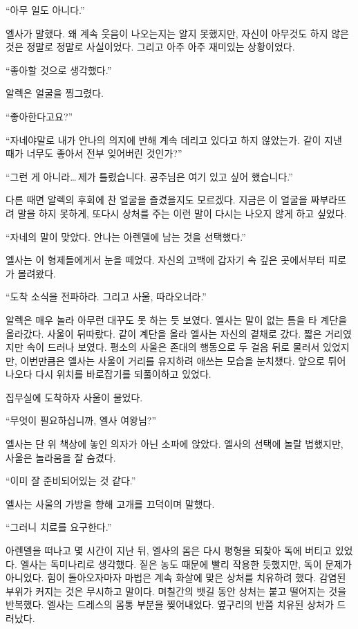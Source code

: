 ``아무 일도 아니다.''

엘사가 말했다. 왜 계속 웃음이 나오는지는 알지 못했지만, 자신이 아무것도 하지 않은 것은 정말로 정말로 사실이었다. 그리고 아주 아주 재미있는 상황이었다.

``좋아할 것으로 생각했다.''

알렉은 얼굴을 찡그렸다.

``좋아한다고요?''

``자네야말로 내가 안나의 의지에 반해 계속 데리고 있다고 하지 않았는가. 같이 지낸 때가 너무도 좋아서 전부 잊어버린 것인가?''

``그런 게 아니라\ldots\,제가 틀렸습니다. 공주님은 여기 있고 싶어 했습니다.''

다른 때면 알렉의 후회에 찬 얼굴을 즐겼을지도 모르겠다. 지금은 이 얼굴을 짜부라뜨려 말을 하지 못하게, 또다시 상처를 주는 이런 말이 다시는 나오지 않게 하고 싶었다.

``자네의 말이 맞았다. 안나는 아렌델에 남는 것을 선택했다.''

엘사는 이 형제들에게서 눈을 떼었다. 자신의 고백에 갑자기 속 깊은 곳에서부터 피로가 몰려왔다.

``도착 소식을 전파하라. 그리고 사울, 따라오너라.''

알렉은 매우 놀라 아무런 대꾸도 못 하는 듯 보였다. 엘사는 말이 없는 틈을 타 계단을 올라갔다. 사울이 뒤따랐다. 같이 계단을 올라 엘사는 자신의 곁채로 갔다. 짧은 거리였지만 속이 드러나 보였다. 평소의 사울은 존대의 행동으로 두 걸음 뒤로 물러서 있었지만, 이번만큼은 엘사는 사울이 거리를 유지하려 애쓰는 모습을 눈치챘다. 앞으로 튀어나오다 다시 위치를 바로잡기를 되풀이하고 있었다.

집무실에 도착하자 사울이 물었다.

``무엇이 필요하십니까, 엘사 여왕님?''

엘사는 단 위 책상에 놓인 의자가 아닌 소파에 앉았다. 엘사의 선택에 놀랄 법했지만, 사울은 놀라움을 잘 숨겼다.

``이미 잘 준비되어있는 것 같다.''

엘사는 사울의 가방을 향해 고개를 끄덕이며 말했다.

``그러니 치료를 요구한다.''

아렌델을 떠나고 몇 시간이 지난 뒤, 엘사의 몸은 다시 평형을 되찾아 독에 버티고 있었다. 엘사는 독미나리로 생각했다. 짙은 농도 때문에 빨리 작용한 듯했지만, 독이 문제가 아니었다. 힘이 돌아오자마자 마법은 계속 화살에 맞은 상처를 치유하려 했다. 감염된 부위가 커지는 것은 무시하고 말이다. 며칠간의 뱃길 동안 상처는 붙고 떨어지는 것을 반복했다. 엘사는 드레스의 몸통 부분을 찢어내었다. 옆구리의 반쯤 치유된 상처가 드러났다.

